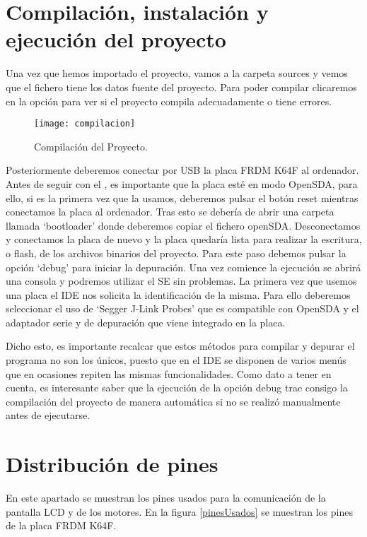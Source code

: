 \section{Compilación, instalación y ejecución del proyecto}\label{sec:compilacion}

Una vez que hemos importado el proyecto, vamos a la carpeta sources y vemos que el fichero tiene los datos fuente del proyecto. Para poder compilar clicaremos en la opción  para ver si el proyecto compila adecuadamente o tiene errores.

\begin{figure}[!h]
	\centering
	\texttt{[image: compilacion]}
	\caption{Compilación del Proyecto.}
\end{figure}
\FloatBarrier

Posteriormente deberemos conectar por USB la placa FRDM K64F al ordenador. Antes de seguir con el , es importante que la placa esté en modo OpenSDA, para ello, si es la primera vez que la usamos, deberemos pulsar el botón reset mientras conectamos la placa al ordenador. Tras esto se debería de abrir una carpeta llamada `bootloader' donde deberemos copiar el fichero openSDA. Desconectamos y conectamos la placa de nuevo y la placa quedaría lista para realizar la escritura, o flash, de los archivos binarios del proyecto. 
Para este paso debemos pulsar la opción `debug' para iniciar la depuración. Una vez comience la ejecución se abrirá una consola y podremos utilizar el SE sin problemas. La primera vez que usemos una placa el IDE nos solicita la identificación de la misma. Para ello deberemos seleccionar el uso de `Segger J-Link Probes' que es compatible con OpenSDA y el adaptador serie y de depuración que viene integrado en la placa.

Dicho esto, es importante recalcar que estos métodos para compilar y depurar el programa no son los únicos, puesto que en el IDE se disponen de varios menús que en ocasiones repiten las mismas funcionalidades. Como dato a tener en cuenta, es interesante saber que la ejecución de la opción debug trae consigo la compilación del proyecto de manera automática si no se realizó manualmente antes de ejecutarse.

\section{Distribución de pines} \label{distribucionDePines}
En este apartado se muestran los pines usados para la comunicación de la pantalla LCD y de los motores. En la figura \ref{pinesUsados} se muestran los pines de la placa FRDM K64F.

